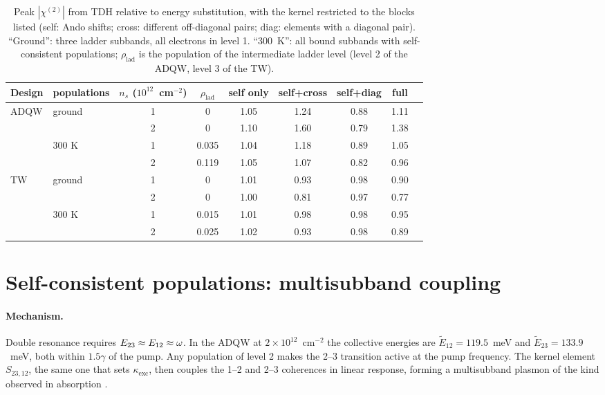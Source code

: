 \documentclass[11pt]{article}
\newcommand{\chitwo}{\chi^{(2)}}
\newcommand{\Et}{\tilde E}
\let\hbar\relax\DeclareRobustCommand{\hbar}{{\mathchar'26\mkern-9mu h}}
\begin{document}
\begin{table}[!t]\centering\small
\caption{Peak $|\chitwo|$ from TDH relative to energy substitution, with the kernel restricted to the blocks listed (self: Ando shifts; cross: different off-diagonal pairs; diag: elements with a diagonal pair). ``Ground'': three ladder subbands, all electrons in level 1. ``300~K'': all bound subbands with self-consistent populations; $\rho_\mathrm{lad}$ is the population of the intermediate ladder level (level 2 of the ADQW, level 3 of the TW).}
\label{tab:masks}
\begin{tabular}{llccccccc}
\toprule
Design & populations & $n_s$ ($10^{12}$~cm$^{-2}$) & $\rho_\mathrm{lad}$ & self only & self+cross & self+diag & full\\
\midrule
ADQW & ground & 1 & 0 & 1.05 & 1.24 & 0.88 & 1.11\\
 & & 2 & 0 & 1.10 & 1.60 & 0.79 & 1.38\\
 & 300 K & 1 & 0.035 & 1.04 & 1.18 & 0.89 & 1.05\\
 & & 2 & 0.119 & 1.05 & 1.07 & 0.82 & 0.96\\
TW & ground & 1 & 0 & 1.01 & 0.93 & 0.98 & 0.90\\
 & & 2 & 0 & 1.00 & 0.81 & 0.97 & 0.77\\
 & 300 K & 1 & 0.015 & 1.01 & 0.98 & 0.98 & 0.95\\
 & & 2 & 0.025 & 1.02 & 0.93 & 0.98 & 0.89\\
\bottomrule
\end{tabular}
\end{table}

\section{Self-consistent populations: multisubband coupling}\label{sec:thermal}
\paragraph{Mechanism.} Double resonance requires $E_{23}\approx E_{12}\approx\hbar\omega$. In the ADQW at $2\times10^{12}$~cm$^{-2}$ the collective energies are $\Et_{12}=119.5$~meV and $\Et_{23}=133.9$~meV, both within $1.5\gamma$ of the pump. Any population of level 2 makes the 2--3 transition active at the pump frequency. The kernel element $S_{23,12}$, the same one that sets $\kappa_\mathrm{exc}$, then couples the 1--2 and 2--3 coherences in linear response, forming a multisubband plasmon of the kind observed in absorption \cite{Delteil2012}.
\end{document}
